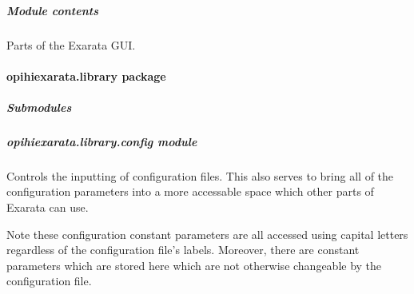 \documentclass[letterpaper,11pt,english]{sphinxmanual}
\begin{document}

\begin{savenotes}\begin{fulllineitems}
\label{\detokenize{code/opihiexarata.gui.selector:opihiexarata.gui.selector.main}}
\pysigstartsignatures
{}
\pysigstopsignatures
\end{fulllineitems}\end{savenotes}



\subparagraph{Module contents}
\label{\detokenize{code/opihiexarata.gui:module-opihiexarata.gui}}\label{\detokenize{code/opihiexarata.gui:module-contents}}
\sphinxAtStartPar
Parts of the Exarata GUI.

\sphinxstepscope


\paragraph{opihiexarata.library package}
\label{\detokenize{code/opihiexarata.library:opihiexarata-library-package}}\label{\detokenize{code/opihiexarata.library::doc}}

\subparagraph{Submodules}
\label{\detokenize{code/opihiexarata.library:submodules}}
\sphinxstepscope


\subparagraph{opihiexarata.library.config module}
\label{\detokenize{code/opihiexarata.library.config:module-opihiexarata.library.config}}\label{\detokenize{code/opihiexarata.library.config:opihiexarata-library-config-module}}\label{\detokenize{code/opihiexarata.library.config::doc}}
\sphinxAtStartPar
Controls the inputting of configuration files. This also serves to bring all
of the configuration parameters into a more accessable space which other parts
of Exarata can use.

\sphinxAtStartPar
Note these configuration constant parameters are all accessed using capital
letters regardless of the configuration file’s labels. Moreover, there are
constant parameters which are stored here which are not otherwise changeable
by the configuration file.
\end{document}
